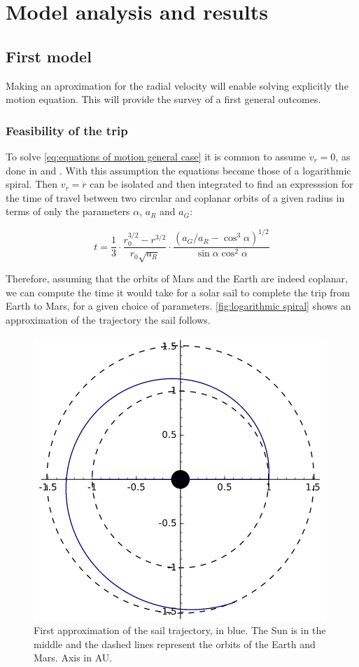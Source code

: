 \documentclass[twocolumn,12pt,a4paper]{article}
\numberwithin{equation}{section}
\begin{document}
\section{Model analysis and results}
\subsection{First model}
Making an aproximation for the radial velocity will enable solving explicitly the motion equation. This will provide the survey of a first general outcomes.

\subsubsection{Feasibility of the trip}
To solve \autoref{eq:equations of motion general case} it is common to assume \( \dot{v}_r = 0\), as done in \cite{tsu} and \cite{mcinnes}. With this assumption the equations become those of a logarithmic spiral. Then \( v_r = \dot{r} \) can be isolated and then integrated to find an expresssion for the time of travel between two circular and coplanar orbits of a given radius in terms of only the parameters \( \alpha \), \( a_R \) and \( a_G \):

\begin{equation} \label{eq:time of flight between orbits}
	t=\frac{1}{3}\cdot\frac{r_0^{3/2}-r^{3/2}}{r_0\sqrt{a_R}}\cdot\frac{(a_G/a_R-\cos^3\alpha)^{1/2}}{\sin\alpha\cos^2\alpha}
\end{equation}

Therefore, assuming that the orbits of Mars and the Earth are indeed coplanar, we can compute the time it would take for a solar sail to complete the trip from Earth to Mars, for a given choice of parameters. \autoref{fig:logarithmic spiral} shows an approximation of the trajectory the sail follows.

\begin{figure}
	\centering
	\includegraphics[scale=0.5]{espiral.png}
	\caption{First approximation of the sail trajectory, in blue. The Sun is in the middle and the dashed lines represent the orbits of the Earth and Mars. Axis in AU.}
	\label{fig:logarithmic spiral}
\end{figure}
\end{document}
